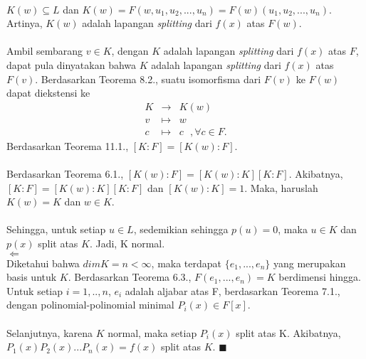 \\	$K(w)\subseteq L$ dan $K(w)=F(w,u_1,u_2,...,u_n) = F(w) (u_1,u_2,...,u_n).$ Artinya, $K(w)$ adalah lapangan \textit{splitting} dari $f(x)$ atas $F(w).$ 
\\ \\ 	
	Ambil sembarang $v\in K$, dengan $K$ adalah lapangan \textit{splitting} dari $f(x)$ atas $F$, dapat pula dinyatakan bahwa $K$ adalah lapangan \textit{splitting} dari $f(x)$ atas $F(v)$. Berdasarkan Teorema 8.2., suatu isomorfisma dari $F(v)$ ke $F(w)$ dapat diekstensi 	ke
	$$\begin{array}{rcl}
	K &\longrightarrow& K(w)\\
	v &\mapsto& w\\
	c &\mapsto& c~~~,\forall c\in F.
	 \end{array}$$
	Berdasarkan Teorema 11.1., $[K:F]=[K(w):F]$.
\\ \\
	Berdasarkan Teorema 6.1., $[K(w):F]=[K(w):K][K:F]$. Akibatnya, $[K:F]=[K(w):K][K:F]$ dan $[K(w):K]=1$. Maka, haruslah $K(w)=K$ dan $w \in K$.
\\ \\
	Sehingga, untuk setiap $u\in L$, sedemikian sehingga $p(u)=0$, maka $u\in K$ dan $p(x)$ split atas $K$. Jadi, K normal.
\\
	$\Leftarrow$
\\ 	Diketahui bahwa $dimK=n<\infty$, maka terdapat $\{e_1,...,e_n\}$ yang merupakan basis untuk $K$. Berdasarkan Teorema 6.3., $F(e_1,...,e_n)= K$ berdimensi hingga. Untuk setiap $i=1,..,n$, $e_i$ adalah aljabar atas F, berdasarkan Teorema 7.1., dengan polinomial-polinomial minimal $P_i(x)\in F[x]$.
\\ \\ 	Selanjutnya, karena $K$ normal, maka setiap  $P_i(x)$ split atas K. Akibatnya, $P_1(x)P_2(x)...P_n(x)=f(x)$ split atas $K$. $\blacksquare$
